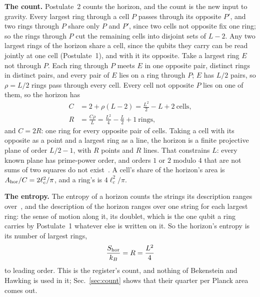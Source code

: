 \documentclass[aps,prd,twocolumn,superscriptaddress,nofootinbib,showkeys]{revtex4-2}
\newcommand{\lc}{\ell_c}
\begin{document}
\textbf{The count.} Postulate~2 counts the horizon, and the count is the new input to gravity. Every largest ring through a cell $P$ passes through its opposite $P'$, and two rings through $P$ share only $P$ and $P'$, since two cells not opposite fix one ring; so the rings through $P$ cut the remaining cells into disjoint sets of $L-2$. Any two largest rings of the horizon share a cell, since the qubits they carry can be read jointly at one cell (Postulate~1), and with it its opposite. Take a largest ring $E$ not through $P$. Each ring through $P$ meets $E$ in one opposite pair, distinct rings in distinct pairs, and every pair of $E$ lies on a ring through $P$; $E$ has $L/2$ pairs, so $\rho = L/2$ rings pass through every cell. Every cell not opposite $P$ lies on one of them, so the horizon has
\begin{equation}
\begin{split}
C &= 2 + \rho(L-2) = \frac{L^2}{2} - L + 2 \ \text{cells},\\
R &= \frac{C\rho}{L} = \frac{L^2}{4} - \frac{L}{2} + 1 \ \text{rings},
\end{split}
\label{eq:counts}
\end{equation}
and $C = 2R$: one ring for every opposite pair of cells. Taking a cell with its opposite as a point and a largest ring as a line, the horizon is a finite projective plane of order $L/2 - 1$, with $R$ points and $R$ lines. That constrains $L$: every known plane has prime-power order, and orders $1$ or $2$ modulo $4$ that are not sums of two squares do not exist~\cite{bruck1949}. A cell's share of the horizon's area is $A_{\rm hor}/C = 2\lc^2/\pi$, and a ring's is $4\lc^2/\pi$.

\textbf{The entropy.} The entropy of a horizon counts the strings its description ranges over~\cite{korytko2026c}, and the description of the horizon ranges over one string for each largest ring: the sense of motion along it, its doublet, which is the one qubit a ring carries by Postulate~1 whatever else is written on it. So the horizon's entropy is its number of largest rings,
\begin{equation}
\frac{S_{\rm hor}}{k_B} = R = \frac{L^2}{4}
\label{eq:S}
\end{equation}
to leading order. This is the register's count, and nothing of Bekenstein and Hawking is used in it; Sec.~\ref{sec:count} shows that their quarter per Planck area comes out.
\end{document}
